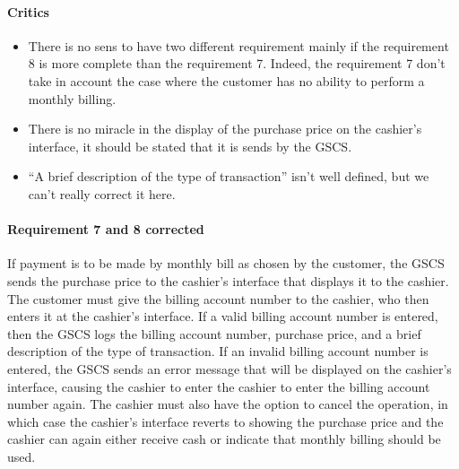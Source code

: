 \begin{framed}
    \paragraph{Critics}
    \begin{itemize}
        \item There is no sens to have two different requirement mainly
            if the requirement 8 is more complete than the requirement
            7. Indeed, the requirement 7 don't take in account the
            case where the customer has no ability to perform a
            monthly billing.
        \item There is no miracle in the display of the purchase price on the
        cashier's interface, it should be stated that it is sends by the GSCS.\@
        \item \enquote{A brief description of the type of transaction} isn't
        well defined, but we can't really correct it here.
    \end{itemize}

    \paragraph{Requirement 7 and 8 corrected} If payment is to be made by monthly bill as
    chosen by the customer, the GSCS sends the
    purchase price to the cashier's interface that displays it to the cashier.
    The customer must give the billing account number
    to the cashier, who then enters it at the cashier's interface. If a valid
    billing account number is entered, then the GSCS logs the billing account number, purchase
    price, and a brief description of the type of transaction. If an
    invalid billing account number is entered, the GSCS sends an error message
    that will be displayed on the cashier's interface, causing the cashier to
    enter the cashier to enter the billing account number again. The cashier must also have
    the option to cancel the operation, in which case the cashier's interface
    reverts to showing the purchase price and the cashier can again either
    receive cash or indicate that monthly billing should be used.
\end{framed}


